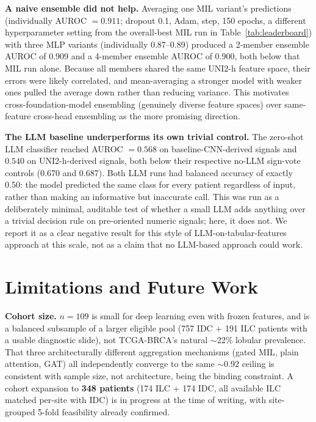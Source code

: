 \documentclass{article}
\begin{document}
\textbf{A naive ensemble did not help.} Averaging one MIL variant's predictions (individually AUROC $=0.911$; dropout 0.1, Adam, step, 150 epochs, a different hyperparameter setting from the overall-best MIL run in Table~\ref{tab:leaderboard}) with three MLP variants (individually 0.87--0.89) produced a 2-member ensemble AUROC of 0.909 and a 4-member ensemble AUROC of 0.900, both below that MIL run alone. Because all members shared the same UNI2-h feature space, their errors were likely correlated, and mean-averaging a stronger model with weaker ones pulled the average down rather than reducing variance. This motivates cross-foundation-model ensembling (genuinely diverse feature spaces) over same-feature cross-head ensembling as the more promising direction.

\textbf{The LLM baseline underperforms its own trivial control.} The zero-shot LLM classifier reached AUROC $=0.568$ on baseline-CNN-derived signals and $0.540$ on UNI2-h-derived signals, both below their respective no-LLM sign-vote controls (0.670 and 0.687). Both LLM runs had balanced accuracy of exactly 0.50: the model predicted the same class for every patient regardless of input, rather than making an informative but inaccurate call. This was run as a deliberately minimal, auditable test of whether a small LLM adds anything over a trivial decision rule on pre-oriented numeric signals; here, it does not. We report it as a clear negative result for this style of LLM-on-tabular-features approach at this scale, not as a claim that no LLM-based approach could work.

\section{Limitations and Future Work}
\label{sec:limitations}

\textbf{Cohort size.} $n=109$ is small for deep learning even with frozen features, and is a balanced subsample of a larger eligible pool (757 IDC + 191 ILC patients with a usable diagnostic slide), not TCGA-BRCA's natural $\sim$22\% lobular prevalence. That three architecturally different aggregation mechanisms (gated MIL, plain attention, GAT) all independently converge to the same $\sim$0.92 ceiling is consistent with sample size, not architecture, being the binding constraint. A cohort expansion to \textbf{348 patients} (174 ILC + 174 IDC, all available ILC matched per-site with IDC) is in progress at the time of writing, with site-grouped 5-fold feasibility already confirmed.
\end{document}
